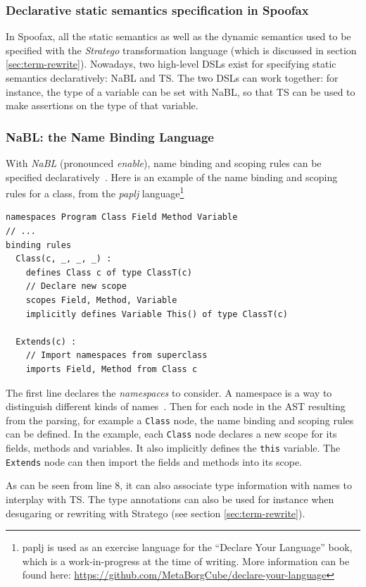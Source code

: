 \subsubsection{Declarative static semantics specification in Spoofax}
\label{sec:orgheadline2}
In Spoofax, all the static semantics as well as the dynamic semantics
used to be specified with the \emph{Stratego} transformation language
(which is discussed in section \ref{sec:term-rewrite}). Nowadays, two
high-level DSLs exist for specifying static semantics declaratively:
NaBL and TS. The two DSLs can work together: for instance, the type of
a variable can be set with NaBL, so that TS can be used to make
assertions on the type of that variable.
\subsubsection{NaBL: the Name Binding Language}
\label{sec:nabl}
With \emph{NaBL} (pronounced \emph{enable}), name binding and scoping rules can
be specified declaratively~\cite{KonatKWV12}. Here is an example
of the name binding and scoping rules for a class, from the \emph{paplj}
language\footnote{paplj is used as an exercise language for the
``Declare Your Language'' book, which is a work-in-progress at the time
of writing. More information can be found here:
\url{https://github.com/MetaBorgCube/declare-your-language}}
\lstset{language=nabl,numbers=left}
\begin{lstlisting}
namespaces Program Class Field Method Variable
// ...
binding rules
  Class(c, _, _, _) :
    defines Class c of type ClassT(c)
    // Declare new scope
    scopes Field, Method, Variable
    implicitly defines Variable This() of type ClassT(c)

  Extends(c) :
    // Import namespaces from superclass
    imports Field, Method from Class c
\end{lstlisting}
The first line declares the \emph{namespaces} to consider. A namespace is a
way to distinguish different kinds of
names~\cite{KonatKWV12}. Then for each node in the AST resulting
from the parsing, for example a \texttt{Class} node, the name binding and
scoping rules can be defined. In the example, each \texttt{Class} node
declares a new scope for its fields, methods and variables. It also
implicitly defines the \texttt{this} variable. The \texttt{Extends} node can then
import the fields and methods into its scope.

As can be seen from line 8, it can also associate type information
with names to interplay with TS. The type annotations can also be used
for instance when desugaring or rewriting with Stratego (see section
\ref{sec:term-rewrite}).
